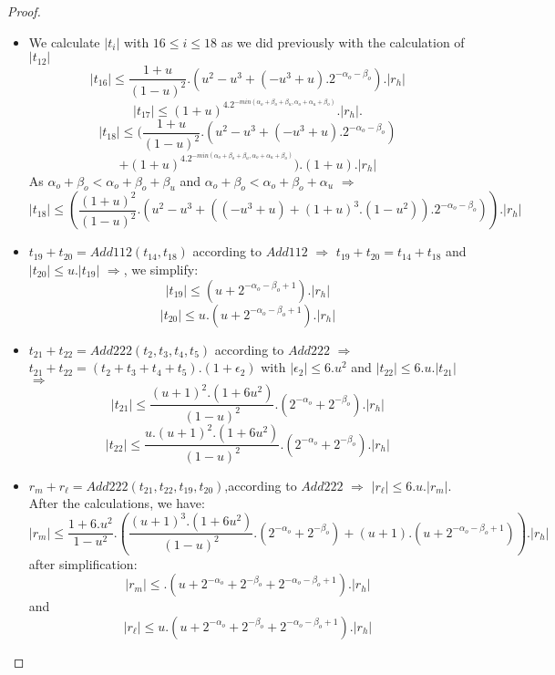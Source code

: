 \begin{proof}
\begin{itemize}
\item We calculate $\lvert t_i \rvert$ with $16 \le i \le 18$ as we did previously with the calculation of $\lvert t_{12} \rvert$
$$ \lvert t_{16} \rvert \le  \frac{1+u}{(1-u)^2}.(u^2 -u^3 + (-u^3+u).2^{-\alpha_o -\beta_o}).\lvert r_h \rvert$$
$$ \lvert t_{17} \rvert \le  (1+ u)^4.2^{-min(\alpha_o +\beta_o +\beta_u,\alpha_o + \alpha_u +\beta_o)}.\lvert r_h \rvert .$$
$$ \lvert t_{18} \rvert \le  (\frac{1+u}{(1-u)^2}.(u^2 -u^3 + (-u^3+u).2^{-\alpha_o -\beta_o})$$
$$ + (1+ u)^4.2^{-min(\alpha_o +\beta_o +\beta_u,\alpha_o + \alpha_u +\beta_o)}).(1+ u). \lvert r_h \rvert $$
As $\alpha_o +\beta_o < \alpha_o +\beta_o +\beta_u$ and $\alpha_o +\beta_o < \alpha_o +\beta_o + \alpha_u$ $\Rightarrow$
$$ \lvert t_{18} \rvert \le  (\frac{(1+u)^2}{(1-u)^2}.(u^2 -u^3 + ((-u^3+u)+(1+u)^3.(1-u^2)).2^{-\alpha_o -\beta_o})). \lvert r_h \rvert $$
\item $t_{19} + t_{20} = Add112(t_{14}, t_{18})$ according to $Add112$ $\Rightarrow$
$t_{19} + t_{20} = t_{14} + t_{18}$ and $\lvert t_{20} \rvert \le u.\lvert t_{19} \rvert $ $\Rightarrow$, we simplify:
$$\lvert t_{19} \rvert \le (u+ 2^{-\alpha_o - \beta_o+1}).\lvert r_h \rvert$$
$$\lvert t_{20} \rvert \le u.(u+ 2^{-\alpha_o - \beta_o+1}).\lvert r_h \rvert$$
\item $t_{21}+t_{22} = Add222(t_2,t_3,t_4,t_5)$ according to $Add222$ $\Rightarrow$
$t_{21}+t_{22} =(t_2+t_3+t_4+t_5).(1+\epsilon_2)$ with $\lvert \epsilon_2 \rvert \le 6.u^2 $ and $\lvert t_{22} \rvert \le 6.u. \lvert t_{21} \rvert$ $\Rightarrow$
$$\lvert t_{21} \rvert \le \frac{(u+1)^2.(1+6u^2)}{(1-u)^2}.(2^{-\alpha_o}+2^{-\beta_o}).\lvert r_h \rvert  $$
$$\lvert t_{22} \rvert \le \frac{u.(u+1)^2.(1+6u^2)}{(1-u)^2}.(2^{-\alpha_o}+2^{-\beta_o}).\lvert r_h \rvert  $$

\item $r_m+r_{\ell} = Add222(t_{21},t_{22},t_{19},t_{20})$,according to $Add222$ $\Rightarrow$ $ \lvert r_{\ell} \rvert \le 6.u. \lvert r_m \rvert$.\\
After the calculations, we have:
$$\lvert r_m \rvert \le \frac{1+6.u^2}{1-u^2}.(\frac{(u+1)^3.(1+6u^2)}{(1-u)^2}.(2^{-\alpha_o}+2^{-\beta_o}) + (u+1).(u+ 2^{-\alpha_o - \beta_o+1})).\lvert r_h \rvert$$
after simplification:
$$\lvert r_m \rvert \le .(u + 2^{-\alpha_o}+2^{-\beta_o} +  2^{-\alpha_o - \beta_o+1}).\lvert r_h \rvert$$
and 
$$\lvert r_{\ell} \rvert \le u.(u + 2^{-\alpha_o}+2^{-\beta_o} +  2^{-\alpha_o - \beta_o+1}).\lvert r_h \rvert$$
\end{itemize}
\end{proof}

